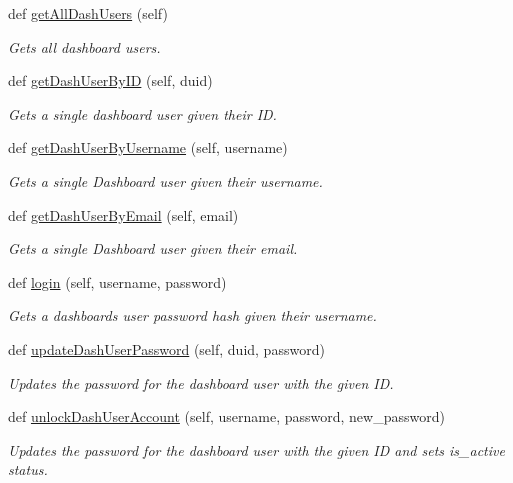 \begin{DoxyCompactItemize}
def \hyperlink{classuser_1_1_user_handler_aea546371e9e8e2f96a5eb7c96b950062}{get\+All\+Dash\+Users} (self)
\begin{DoxyCompactList}\small\item\em Gets all dashboard users. \end{DoxyCompactList}\item 
def \hyperlink{classuser_1_1_user_handler_ad42271d6f499db1db53febb34a1f633f}{get\+Dash\+User\+By\+ID} (self, duid)
\begin{DoxyCompactList}\small\item\em Gets a single dashboard user given their ID. \end{DoxyCompactList}\item 
def \hyperlink{classuser_1_1_user_handler_a28c693c8d9c84ecde0151fdd97c69ee6}{get\+Dash\+User\+By\+Username} (self, username)
\begin{DoxyCompactList}\small\item\em Gets a single Dashboard user given their username. \end{DoxyCompactList}\item 
def \hyperlink{classuser_1_1_user_handler_af262a3beb9f7fffcf266e065edf7b810}{get\+Dash\+User\+By\+Email} (self, email)
\begin{DoxyCompactList}\small\item\em Gets a single Dashboard user given their email. \end{DoxyCompactList}\item 
def \hyperlink{classuser_1_1_user_handler_a36090fca15a4bd0e1f46970113fe4c5a}{login} (self, username, password)
\begin{DoxyCompactList}\small\item\em Gets a dashboard\textquotesingle{}s user password hash given their username. \end{DoxyCompactList}\item 
def \hyperlink{classuser_1_1_user_handler_afb658519400d44f533b521c52e8b7950}{update\+Dash\+User\+Password} (self, duid, password)
\begin{DoxyCompactList}\small\item\em Updates the password for the dashboard user with the given ID. \end{DoxyCompactList}\item 
def \hyperlink{classuser_1_1_user_handler_a89dae0de6917466d2e79ed8916baa997}{unlock\+Dash\+User\+Account} (self, username, password, new\+\_\+password)
\begin{DoxyCompactList}\small\item\em Updates the password for the dashboard user with the given ID and sets is\+\_\+active status. \end{DoxyCompactList}\item 

\end{DoxyCompactItemize}
